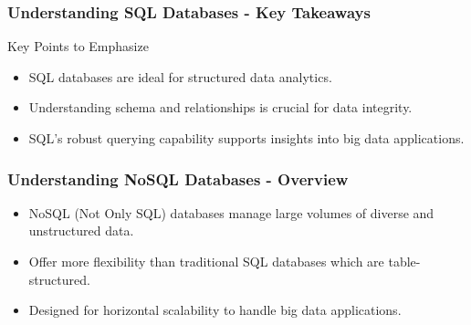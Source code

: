 \documentclass[aspectratio=169]{beamer}
\begin{document}
\begin{frame}[fragile]
    \frametitle{Understanding SQL Databases - Key Takeaways}
    \begin{block}{Key Points to Emphasize}
        \begin{itemize}
            \item SQL databases are ideal for structured data analytics.
            \item Understanding schema and relationships is crucial for data integrity.
            \item SQL's robust querying capability supports insights into big data applications.
        \end{itemize}
    \end{block}
\end{frame}

\begin{frame}[fragile]
    \frametitle{Understanding NoSQL Databases - Overview}
    \begin{itemize}
        \item NoSQL (Not Only SQL) databases manage large volumes of diverse and unstructured data.
        \item Offer more flexibility than traditional SQL databases which are table-structured.
        \item Designed for horizontal scalability to handle big data applications.
    \end{itemize}
\end{frame}
\end{document}
